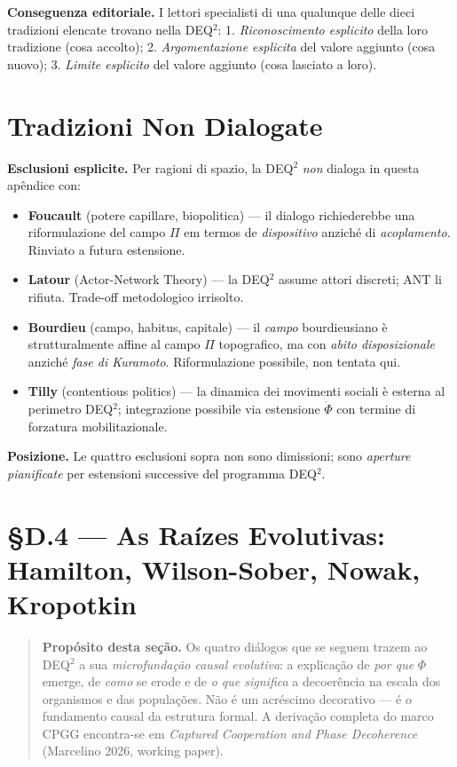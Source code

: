 \Proved{} \textbf{Conseguenza editoriale.} I lettori specialisti di una
qualunque delle dieci tradizioni elencate trovano nella DEQ$^2$: 1.
\emph{Riconoscimento esplicito} della loro tradizione (cosa accolto); 2.
\emph{Argomentazione esplicita} del valore aggiunto (cosa nuovo); 3.
\emph{Limite esplicito} del valore aggiunto (cosa lasciato a loro).



\section{Tradizioni Non Dialogate}\label{tradizioni-non-dialogate}

\Conj{} \textbf{Esclusioni esplicite.} Per ragioni di spazio, la DEQ$^2$
\emph{non} dialoga in questa apêndice con:

\begin{itemize}
\tightlist
\item
  \textbf{Foucault} (potere capillare, biopolitica) --- il dialogo
  richiederebbe una riformulazione del campo \(\Pi\) em termos de
  \emph{dispositivo} anziché di \emph{acoplamento}. Rinviato a futura
  estensione.
\item
  \textbf{Latour} (Actor-Network Theory) --- la DEQ$^2$ assume attori
  discreti; ANT li rifiuta. Trade-off metodologico irrisolto.
\item
  \textbf{Bourdieu} (campo, habitus, capitale) --- il \emph{campo}
  bourdieusiano è strutturalmente affine al campo \(\Pi\) topografico,
  ma con \emph{abito disposizionale} anziché \emph{fase di Kuramoto}.
  Riformulazione possibile, non tentata qui.
\item
  \textbf{Tilly} (contentious politics) --- la dinamica dei movimenti
  sociali è esterna al perimetro DEQ$^2$; integrazione possibile via
  estensione \(\dot\Phi\) con termine di forzatura mobilitazionale.
\end{itemize}

\Proved{} \textbf{Posizione.} Le quattro esclusioni sopra non sono
dimissioni; sono \emph{aperture pianificate} per estensioni successive
del programma DEQ$^2$.



\section{§D.4 --- As Ra\'{i}zes Evolutivas: Hamilton, Wilson-Sober, Nowak, Kropotkin}\label{d4-radici-evolutive}

\begin{quote}
\textbf{Prop\'{o}sito desta se\c{c}\~{a}o.} Os quatro di\'{a}logos que
se seguem trazem ao DEQ$^2$ a sua \emph{microfunda\c{c}\~{a}o causal
evolutiva}: a explica\c{c}\~{a}o de \emph{por que} $\Phi$ emerge, de
\emph{como} se erode e de \emph{o que significa} a decoer\^{e}ncia na
escala dos organismos e das popula\c{c}\~{o}es. N\~{a}o \'{e} um
acr\'{e}scimo decorativo --- \'{e} o fundamento causal da estrutura
formal. A deriva\c{c}\~{a}o completa do marco CPGG encontra-se em
\emph{Captured Cooperation and Phase Decoherence} (Marcelino 2026,
working paper).
\end{quote}

